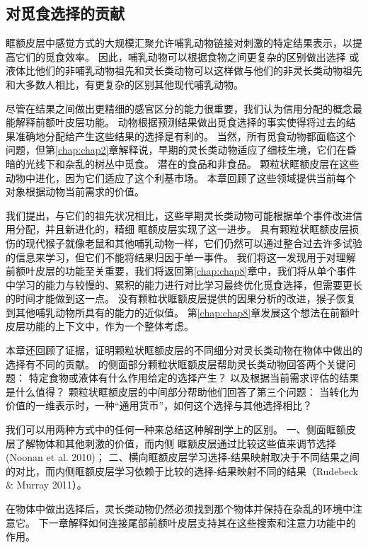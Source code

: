 \subsection{对觅食选择的贡献}

眶额皮层中感觉方式的大规模汇聚允许哺乳动物链接对刺激的特定结果表示，以提高它们的觅食效率。
因此，哺乳动物可以根据食物之间更复杂的区别做出选择
或液体比他们的非哺乳动物祖先和灵长类动物可以这样做与他们的非灵长类动物祖先和大多数人相比，有更复杂的区别其他现代哺乳动物。\par


尽管在结果之间做出更精细的感官区分的能力很重要，我们认为信用分配的概念最能解释前额叶皮层功能。
动物根据预测结果做出觅食选择的事实使得将过去的结果准确地分配给产生这些结果的选择是有利的。
当然，所有觅食动物都面临这个问题，但第\ref{chap:chap2}章解释说，早期的灵长类动物适应了细枝生境，它们在昏暗的光线下和杂乱的树丛中觅食。
潜在的食品和非食品。
颗粒状眶额皮层在这些动物中进化，因为它们适应了这个利基市场。
本章回顾了这些领域提供当前每个对象根据动物当前需求的价值。\par


我们提出，与它们的祖先状况相比，这些早期灵长类动物可能根据单个事件改进信用分配，并且新进化的，精细 眶额皮层实现了这一进步。
具有颗粒状眶额皮层损伤的现代猴子就像老鼠和其他哺乳动物一样，它们仍然可以通过整合过去许多试验的信息来学习，但它们不能将结果归因于单一事件。
我们将这一发现用于对理解前额叶皮层的功能至关重要，我们将返回第\ref{chap:chap8}章中，我们将从单个事件中学习的能力与较慢的、累积的能力进行对比学习最终优化觅食选择，但需要更长的时间才能做到这一点。
没有颗粒状眶额皮层提供的因果分析的改进，猴子恢复到其他哺乳动物所具有的能力的近似值。
第\ref{chap:chap8}章发展这个想法在前额叶皮层功能的上下文中，作为一个整体考虑。\par


本章还回顾了证据，证明颗粒状眶额皮层的不同细分对灵长类动物在物体中做出的选择有不同的贡献。
的侧面部分颗粒状眶额皮层帮助灵长类动物回答两个关键问题：
特定食物或液体有什么作用给定的选择产生？
以及根据当前需求评估的结果是什么值得？
颗粒状眶额皮层的中间部分帮助他们回答了第三个问题：
当转化为价值的一维表示时，一种“通用货币”，如何这个选择与其他选择相比？\par


我们可以用两种方式中的任何一种来总结这种解剖学上的区别。 
一、侧面眶额皮层了解物体和其他刺激的价值，而内侧 眶额皮层通过比较这些值来调节选择 (Noonan et al. 2010)； 
二、横向眶额皮层学习选择-结果映射取决于不同结果之间的对比，而内侧眶额皮层学习依赖于比较的选择-结果映射不同的结果（Rudebeck \& Murray 2011）。\par


在物体中做出选择后，灵长类动物仍然必须找到那个物体并保持在杂乱的环境中注意它。
下一章解释如何连接尾部前额叶皮层支持其在这些搜索和注意力功能中的作用。\par



